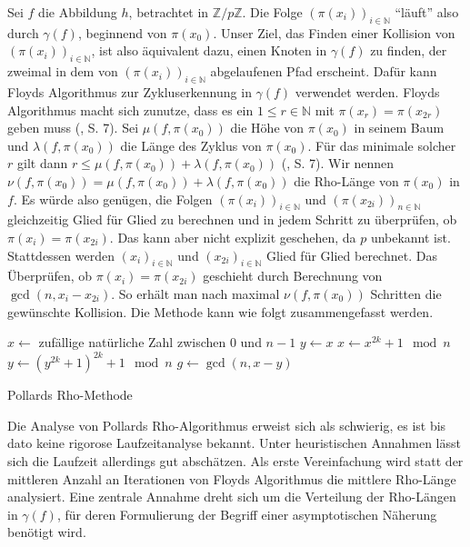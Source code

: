 \documentclass[a4paper, 11pt, ngerman]{article}
\newcommand{\N}{\mathbb{N}}
\newcommand{\Z}{\mathbb{Z}}
\theoremstyle{definition}
\theoremstyle{plain}
\theoremstyle{remark}
\begin{document}
Sei $f$ die Abbildung $h$, betrachtet in $\Z/p\Z$. Die Folge $(\pi(x_{i}))_{i \in \N}$ "`läuft"' also durch $\gamma(f)$, beginnend von $\pi(x_0)$. Unser Ziel, das Finden einer Kollision von $(\pi(x_i))_{i \in \N}$, ist also äquivalent dazu, einen Knoten in $\gamma(f)$ zu finden, der zweimal in dem von $(\pi(x_i))_{i \in \N}$ abgelaufenen Pfad erscheint. Dafür kann Floyds Algorithmus zur Zykluserkennung in $\gamma(f)$ verwendet werden. Floyds Algorithmus macht sich zunutze, dass es ein $1 \le r \in \N$ mit $\pi(x_r) = \pi(x_{2r})$ geben muss (\cite{knu98}, S. 7). Sei $\mu(f, \pi(x_0))$ die Höhe von $\pi(x_0)$ in seinem Baum und $\lambda(f, \pi(x_0))$ die Länge des Zyklus von $\pi(x_0)$. Für das minimale solcher $r$ gilt dann $r \le \mu(f, \pi(x_0)) + \lambda(f, \pi(x_0))$ (\cite{knu98}, S. 7). Wir nennen $\nu(f, \pi(x_0)) = \mu(f, \pi(x_0)) + \lambda(f, \pi(x_0))$ die Rho-Länge von $\pi(x_0)$ in $f$. Es würde also genügen, die Folgen $(\pi(x_i))_{i \in \N}$ und $(\pi(x_{2i}))_{n \in \N}$ gleichzeitig Glied für Glied zu berechnen und in jedem Schritt zu überprüfen, ob $\pi(x_i) = \pi(x_{2i})$. Das kann aber nicht explizit geschehen, da $p$ unbekannt ist. Stattdessen werden $(x_i)_{i \in \N}$ und $(x_{2i})_{i \in \N}$ Glied für Glied berechnet. Das Überprüfen, ob $\pi(x_i) = \pi(x_{2i})$ geschieht durch Berechnung von $\gcd(n, x_i - x_{2i})$. So erhält man nach maximal $\nu(f, \pi(x_0))$ Schritten die gewünschte Kollision. Die Methode kann wie folgt zusammengefasst werden.

\begin{algorithm*}
    $x \gets $ zufällige natürliche Zahl zwischen $0$ und $n - 1$ \;
    $y \gets x$ \;
    {
        $x \gets x^{2k} + 1 \mod n$ \;
        $y \gets (y^{2k} + 1)^{2k} + 1 \mod n$ \;
        $g \gets \gcd(n, x - y)$ \;
        {
             \;
        }
    }

    \caption{Pollards Rho-Methode}
\end{algorithm*}

\noindent Die Analyse von Pollards Rho-Algorithmus erweist sich als schwierig, es ist bis dato keine rigorose Laufzeitanalyse bekannt. Unter heuristischen Annahmen lässt sich die Laufzeit allerdings gut abschätzen. Als erste Vereinfachung wird statt der mittleren Anzahl an Iterationen von Floyds Algorithmus die mittlere Rho-Länge analysiert. Eine zentrale Annahme dreht sich um die Verteilung der Rho-Längen in $\gamma(f)$, für deren Formulierung der Begriff einer asymptotischen Näherung benötigt wird.
\end{document}
